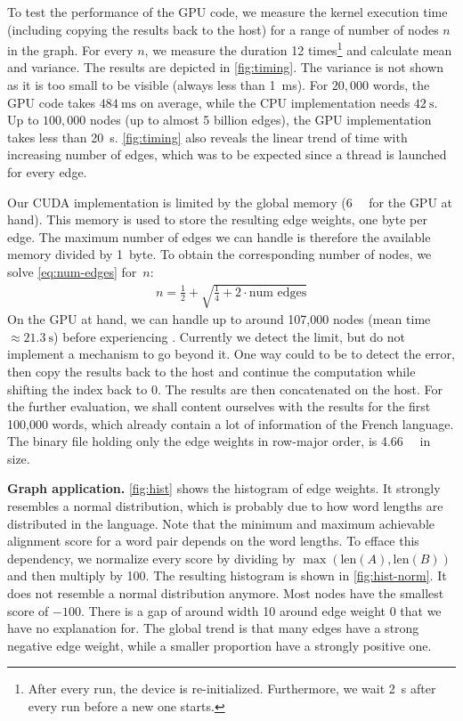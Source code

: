 \vspace{-1.5em}

To test the performance of the GPU code, we measure the kernel execution time (including copying the results back to the host) for a range of number of nodes $n$ in the graph. For every $n$, we measure the duration 12 times\footnote{After every run, the device is re-initialized. Furthermore, we wait \qty{2}{\s} after every run before a new one starts.} and calculate mean and variance. The results are depicted in \autoref{fig:timing}. The variance is not shown as it is too small to be visible (always less than \qty{1}{\ms}). For $20,000$ words, the GPU code takes $\qty{484}{\ms}$ on average, while the CPU implementation needs $\qty{42}{\s}$. Up to $100,000$ nodes (\ie up to almost 5 billion edges), the GPU implementation takes less than \qty{20}{\s}. \autoref{fig:timing} also reveals the linear trend of time with increasing number of edges, which was to be expected since a thread is launched for every edge.

Our CUDA implementation is limited by the global memory (\qty{6}{\giga\byte} for the GPU at hand). This memory is used to store the resulting edge weights, \ie one byte per edge. The maximum number of edges we can handle is therefore the available memory divided by 1~byte. To obtain the corresponding number of nodes, we solve \eqref{eq:num-edges} for~$n$:
\begin{align}
    n = \frac{1}{2} + \sqrt{\frac{1}{4} + 2 \cdot \text{num edges}}
\end{align}
On the GPU at hand, we can handle up to around 107,000 nodes (mean time $\approx \qty{21.3}{\s}$) before experiencing . Currently we detect the limit, but do not implement a mechanism to go beyond it. One way could to be to detect the error, then copy the results back to the host and continue the computation while shifting the index back to $0$. The results are then concatenated on the host. For the further evaluation, we shall content ourselves with the results for the first 100,000 words, which already contain a lot of information of the French language. The binary file holding only the edge weights in row-major order, is \qty{4.66}{\giga\byte} in size.

\textbf{Graph application.} \autoref{fig:hist} shows the histogram of edge weights. It strongly resembles a normal distribution, which is probably due to how word lengths are distributed in the language. Note that the minimum and maximum achievable alignment score for a word pair depends on the word lengths. To efface this dependency, we normalize every score by dividing by $\max(\text{len}(A), \text{len}(B))$ and then multiply by 100. The resulting histogram is shown in \autoref{fig:hist-norm}. It does not resemble a normal distribution anymore. Most nodes have the smallest score of $-100$. There is a gap of around width 10 around edge weight 0 that we have no explanation for. The global trend is that many edges have a strong negative edge weight, while a smaller proportion have a strongly positive one.\label{paragraph:normalization}

